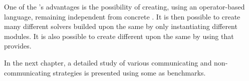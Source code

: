 One of the \posl's advantages is the possibility of creating, using an operator-based language, \ass{} remaining independent from concrete \bothmodules{}. It is then possible to create many different solvers builded upon the same \as{} by only instantiating different modules. It is also possible to create different \comstrs{} upon the same \soset{} by using \commopers{} that \posl{} provides.

In the next chapter, a detailed study of various communicating and non-communicating strategies is presented using some \CSPs{} as benchmarks. %